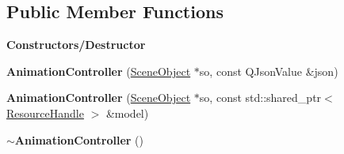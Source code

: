 \subsection*{Public Member Functions}
\begin{Indent}\textbf{ Constructors/\+Destructor}\par
\begin{DoxyCompactItemize}
\item 
\mbox{\label{classrev_1_1_animation_controller_aab05d623ad2ed54f839357703dffeabb}} 
{\bfseries Animation\+Controller} (\mbox{\hyperlink{classrev_1_1_scene_object}{Scene\+Object}} $\ast$so, const Q\+Json\+Value \&json)
\item 
\mbox{\label{classrev_1_1_animation_controller_ae5ac3bfba05cc5a54195e3eeab3e0467}} 
{\bfseries Animation\+Controller} (\mbox{\hyperlink{classrev_1_1_scene_object}{Scene\+Object}} $\ast$so, const std\+::shared\+\_\+ptr$<$ \mbox{\hyperlink{classrev_1_1_resource_handle}{Resource\+Handle}} $>$ \&model)
\item 
\mbox{\label{classrev_1_1_animation_controller_afc86647f7867e454a24024154bb0be57}} 
{\bfseries $\sim$\+Animation\+Controller} ()
\end{DoxyCompactItemize}
\end{Indent}
